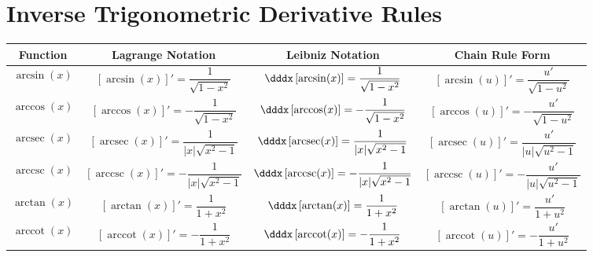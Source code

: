 \documentclass{siproblemset}
\DeclareMathOperator{\arcsec}{arcsec}
\DeclareMathOperator{\arccot}{arccot}
\DeclareMathOperator{\arccsc}{arccsc}
\begin{document}
    \section{Inverse Trigonometric Derivative Rules}
    \begin{tabular}{|c c c c|}
        \hline
        Function & Lagrange Notation & Leibniz Notation & Chain Rule Form \\
        \hline
        $\arcsin(x)$ & $[\arcsin (x)]'=\dfrac{1}{\sqrt{1-x^2}}$ & $\dddx\left[\arcsin(x)\right]=\dfrac{1}{\sqrt{1-x^2}}$ & $[\arcsin(u)]'=\dfrac{u'}{\sqrt{1-u^2}}$ \\
        $\arccos(x)$ & $[\arccos(x)]'=-\dfrac{1}{\sqrt{1-x^2}}$ & $\dddx\left[\arccos(x)\right]=-\dfrac{1}{\sqrt{1-x^2}}$ & $[\arccos(u)]'=-\dfrac{u'}{\sqrt{1-u^2}}$ \\
        \hline
        $\arcsec(x)$ & $[\arcsec (x)]'=\dfrac{1}{|x|\sqrt{x^2-1}}$ & $\dddx\left[\arcsec(x)\right]=\dfrac{1}{|x|\sqrt{x^2-1}}$ & $[\arcsec(u)]'=\dfrac{u'}{|u|\sqrt{u^2-1}}$ \\
        $\arccsc(x)$ & $[\arccsc (x)]'=-\dfrac{1}{|x|\sqrt{x^2-1}}$ & $\dddx\left[\arccsc(x)\right]=-\dfrac{1}{|x|\sqrt{x^2-1}}$ & $[\arccsc(u)]'=-\dfrac{u'}{|u|\sqrt{u^2-1}}$ \\
        \hline
        $\arctan(x)$ & $[\arctan (x)]'=\dfrac{1}{1+x^2}$ & $\dddx\left[\arctan(x)\right]=\dfrac{1}{1+x^2}$ & $[\arctan(u)]'=\dfrac{u'}{1+u^2}$ \\
        $\arccot(x)$ & $[\arccot (x)]'=-\dfrac{1}{1+x^2}$ & $\dddx\left[\arccot(x)\right]=-\dfrac{1}{1+x^2}$ & $[\arccot(u)]'=-\dfrac{u'}{1+u^2}$ \\
        \hline
    \end{tabular}
\end{document}
